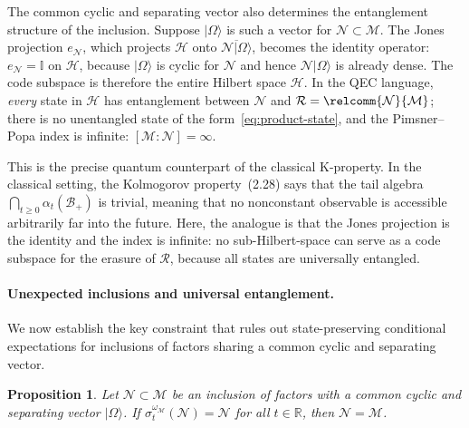 \documentclass[a4paper,11pt]{article}
\newtheorem{proposition}[theorem]{Proposition}
\theoremstyle{definition}
\newcommand{\id}{\mathbb{I}}
\begin{document}
The common cyclic and separating vector also determines the entanglement structure of
the inclusion.  Suppose $|\Omega\rangle$ is such a vector for $\mathcal{N}\subset\mathcal{M}$.
The Jones projection $e_\mathcal{N}$, which projects $\mathcal{H}$ onto
$\overline{\mathcal{N}|\Omega\rangle}$, becomes the identity operator:
$e_\mathcal{N}=\id$ on $\mathcal{H}$, because $|\Omega\rangle$ is cyclic for $\mathcal{N}$
and hence $\mathcal{N}|\Omega\rangle$ is already dense.  The code subspace is therefore
the entire Hilbert space $\mathcal{H}$.  In the QEC language, \emph{every} state in
$\mathcal{H}$ has entanglement between $\mathcal{N}$ and $\mathcal{R}=\relcomm{\mathcal{N}}{\mathcal{M}}$;
there is no unentangled state of the form~\eqref{eq:product-state}, and the Pimsner--Popa
index is infinite: $[\mathcal{M}:\mathcal{N}]=\infty$.

This is the precise quantum counterpart of the classical K-property.  In the classical
setting, the Kolmogorov property~(2.28) says that the tail algebra
$\bigcap_{t\geq 0}\alpha_t(\mathcal{B}_+)$ is trivial, meaning that no nonconstant
observable is accessible arbitrarily far into the future.  Here, the analogue is that the
Jones projection is the identity and the index is infinite: no sub-Hilbert-space can
serve as a code subspace for the erasure of $\mathcal{R}$, because all states are
universally entangled.

\paragraph{Unexpected inclusions and universal entanglement.}
We now establish the key constraint that rules out state-preserving conditional expectations
for inclusions of factors sharing a common cyclic and separating vector.

\begin{proposition}\label{prop:common-css-no-invariance}
Let $\mathcal{N}\subset\mathcal{M}$ be an inclusion of factors with a common cyclic and
separating vector $|\Omega\rangle$.  If $\sigma_t^{\omega_\mathcal{M}}(\mathcal{N})=\mathcal{N}$
for all $t\in\mathbb{R}$, then $\mathcal{N}=\mathcal{M}$.
\end{proposition}
\end{document}
